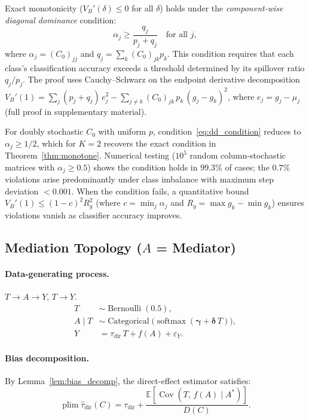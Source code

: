 \begin{remark}
\label{rem:conditional_monotonicity}
Exact monotonicity ($V_B'(\delta) \leq 0$ for all $\delta$) holds under the \emph{component-wise diagonal dominance} condition:
\begin{equation}
  \alpha_j \geq \frac{q_j}{p_j + q_j} \quad \text{for all } j,
  \label{eq:dd_condition}
\end{equation}
where $\alpha_j = (C_0)_{jj}$ and $q_j = \sum_k (C_0)_{jk} p_k$. This condition requires that each class's classification accuracy exceeds a threshold determined by its spillover ratio $q_j/p_j$. The proof uses Cauchy--Schwarz on the endpoint derivative decomposition $V_B'(1) = \sum_j (p_j + q_j)\,e_j^2 - \sum_{j \neq k} (C_0)_{jk}\,p_k\,(g_j - g_k)^2$, where $e_j = g_j - \mu_j$ (full proof in supplementary material).

For doubly stochastic $C_0$ with uniform $p$, condition~\eqref{eq:dd_condition} reduces to $\alpha_j \geq 1/2$, which for $K{=}2$ recovers the exact condition in Theorem~\ref{thm:monotone}. Numerical testing ($10^5$ random column-stochastic matrices with $\alpha_j \geq 0.5$) shows the condition holds in $99.3\%$ of cases; the $0.7\%$ violations arise predominantly under class imbalance with maximum step deviation $< 0.001$. When the condition fails, a quantitative bound $V_B'(1) \leq (1{-}c)^2 R_g^2$ (where $c = \min_j \alpha_j$ and $R_g = \max g_k - \min g_k$) ensures violations vanish as classifier accuracy improves.
\end{remark}

\subsection{Mediation Topology ($A$ = Mediator)}
\label{app:mediation}

\paragraph{Data-generating process.}
$T\to A\to Y$, $T\to Y$.
\begin{align*}
  T &\sim \operatorname{Bernoulli}(0.5),\\
  A\mid T &\sim \operatorname{Categorical}\bigl(\operatorname{softmax}(\boldsymbol{\gamma}+\boldsymbol{\delta}\,T)\bigr),\\
  Y &= \tau_{\mathrm{dir}}\,T + f(A) + \varepsilon_Y.
\end{align*}

\paragraph{Bias decomposition.}
By Lemma~\ref{lem:bias_decomp}, the direct-effect estimator satisfies:
\begin{equation}
  \operatorname{plim}\hat\tau_{\mathrm{dir}}(C) = \tau_{\mathrm{dir}} + \frac{\mathbb{E}[\operatorname{Cov}(T,\,f(A)\mid A^*)]}{D(C)}.
  \label{eq:med_bias}
\end{equation}

